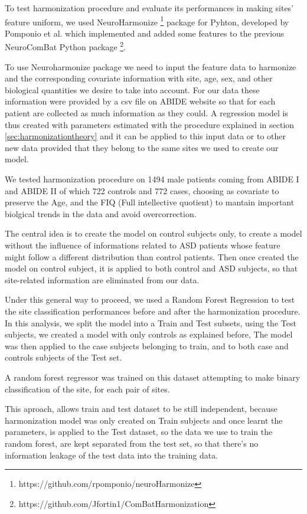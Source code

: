 \documentclass[a4paper,11pt]{article}
\begin{document}
To test harmonization procedure and evaluate its performances in making sites' feature uniform, we used NeuroHarmonize \footnote{https://github.com/rpomponio/neuroHarmonize} package for Pyhton, developed by Pomponio et al. \cite{pomponio-2019} which implemented and added some features to the previous NeuroComBat Python package \footnote{https://github.com/Jfortin1/ComBatHarmonization}.

To use Neuroharmonize package we need to input the feature data to harmonize and the corresponding covariate information with site, age, sex, and other biological quantities we desire to take into account.
For our data these information were provided by a csv file on ABIDE website so that for each patient are collected as much information as they could.
A regression model is thus created with parameters estimated with the procedure explained in section \ref{sec:harmonizationtheory} and it can be applied to this input data or to other new data provided that they belong to the same sites we used to create our model.

We tested harmonization procedure on 1494 male patients coming from ABIDE I and ABIDE II of which 722 controls and 772 cases, choosing as covariate to preserve the Age, and the FIQ (Full intellective quotient) to mantain important biolgical trends in the data and avoid overcorrection.


The central idea is to create the model on control subjects only, to create a model without the influence of informations related to ASD patients whose feature might follow a different distribution than control patients.
Then once created the model on control subject, it is applied to both control and ASD subjects, so that site-related information are eliminated from our data.

Under this general way to proceed, we used a Random Forest Regression to test the site classification performances before and after the harmonization procedure.
In this analysis, we split the model into a Train and Test subsets, using the Test subjects, we created a model with only controls as explained before,
The model was then applied to the case subjects belonging to train, and to both case and controls subjects of the Test set.

A random forest regressor was trained on this dataset attempting to make binary classification of the site, for each pair of sites.

This aproach, allows train and test dataset to be still independent, because harmonization model was only created on Train subjects and once learnt the parameters, is applied to the Test dataset, so the data we use to train the random forest, are kept separated from the test set, so that there's no information leakage of the test data into the training data.
\newline
\end{document}
